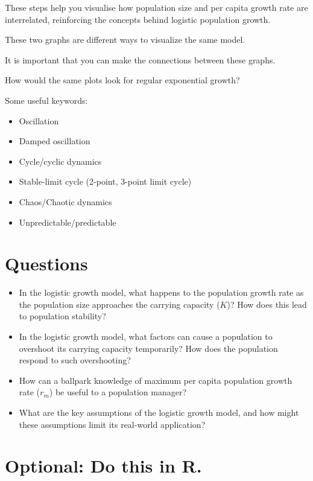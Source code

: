 \documentclass[
  a4paper]{book}
\providecommand{\tightlist}{%
  \setlength{\itemsep}{0pt}\setlength{\parskip}{0pt}}
\begin{document}
These steps help you visualise how population size and per capita growth rate are interrelated, reinforcing the concepts behind logistic population growth.

\begin{do-something}
These two graphs are different ways to visualize the same model.

It is important that you can make the connections between these graphs.

How would the same plots look for regular exponential growth?
\end{do-something}

Some useful keywords:

\begin{itemize}
\tightlist
\item
  Oscillation
\item
  Damped oscillation
\item
  Cycle/cyclic dynamics
\item
  Stable-limit cycle (2-point, 3-point limit cycle)
\item
  Chaos/Chaotic dynamics
\item
  Unpredictable/predictable
\end{itemize}

\section{Questions}\label{questions-5}

\begin{itemize}
\item
  In the logistic growth model, what happens to the population growth rate as the population size approaches the carrying capacity (\(K\))? How does this lead to population stability?
\item
  In the logistic growth model, what factors can cause a population to overshoot its carrying capacity temporarily? How does the population respond to such overshooting?
\item
  How can a ballpark knowledge of maximum per capita population growth rate (\(r_m\)) be useful to a population manager?
\item
  What are the key assumptions of the logistic growth model, and how might these assumptions limit its real-world application?
\end{itemize}

\section{Optional: Do this in R.}\label{optional-do-this-in-r.}
\end{document}
